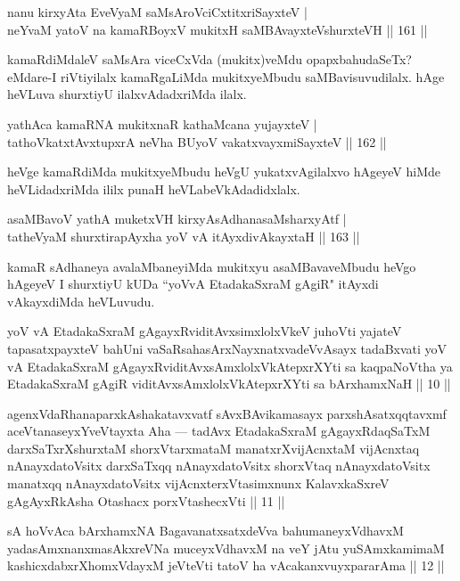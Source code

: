 
\begin{shl}
nanu kirxyAta EveVyaM saMsAroVciCxtitxriSayxteV |\\
neYvaM yatoV na kamaRBoyxV mukitxH saMBAvayxteV\s shurxteVH \hfill || 161 ||
\end{shl}

\begin{artha}
kamaRdiMdaleV saMsAra viceCxVda (mukitx)veMdu opapxbahudaSeTx? eMdare-I riVtiyilalx kamaRgaLiMda mukitxyeMbudu saMBavisuvudilalx. hAge heVLuva shurxtiyU ilalxvAdadxriMda ilalx.
\end{artha}

\begin{shl}
yathAca kamaRNA mukitxnaR kathaMcana yujayxteV |\\
tathoVkatxtAvxtupxrA neVha BUyoV vakatxvayxmiSayxteV \hfill || 162 ||
\end{shl}

\begin{artha}%
heVge kamaRdiMda mukitxyeMbudu heVgU yukatxvAgilalxvo hAgeyeV hiMde heVLidadxriMda ililx punaH heVLabeVkAdadidxlalx.
\end{artha}

\begin{shl}
asaMBavoV yathA muketxVH kirxyAsAdhanasaMsharxyAtf |\\
tatheVyaM shurxtirapAyxha yoV vA itAyxdivAkayxtaH \hfill || 163 ||
\end{shl}

\begin{artha}
kamaR sAdhaneya avalaMbaneyiMda mukitxyu asaMBavaveMbudu heVgo hAgeyeV I shurxtiyU kUDa ``yoVvA EtadakaSxraM gAgiR" itAyxdi vAkayxdiMda heVLuvudu.
\end{artha}

\begin{shl}
yoV vA EtadakaSxraM gAgayxRviditAvxsimxlolxVkeV juhoVti yajateV tapasatxpayxteV bahUni vaSaRsahasArxNayxnatxvadeVvAsayx tadaBxvati yoV vA EtadakaSxraM gAgayxRviditAvxsAmxlolxVkAtepxrXYti sa kaqpaNoV\s tha ya EtadakaSxraM gAgiR viditAvxsAmxlolxVkAtepxrXYti sa bArxhamxNaH || 10 ||

agenxVdaRhanaparxkAshakatavxvatf sAvxBAvikamasayx parxshAsatxqqtavxmf aceVtanaseyxYveVtayxta Aha — tadAvx EtadakaSxraM gAgayxRdaqSaTxM darxSaTxrXshurxtaM shorxVtarxmataM manatxrXvijAcnxtaM vijAcnxtaq nAnayxdatoV\s sitx darxSaTxqq nAnayxdatoV\s sitx shorxVtaq nAnayxdatoV\s sitx manatxqq nAnayxdatoV\s sitx vijAcnxterxVtasimxnunx KalavxkaSxreV gAgAyxRkAsha Otashacx porxVtashecxVti || 11 ||

sA hoVvAca bArxhamxNA BagavanatxsatxdeVva bahumaneyxVdhavxM yadasAmxnanxmasAkxreVNa muceyxVdhavxM na veY jAtu yuSAmxkamimaM kashicxdabxrXhomxVdayxM jeVteVti tatoV ha vAcakanxvuyxpararAma || 12 ||
\end{shl}

